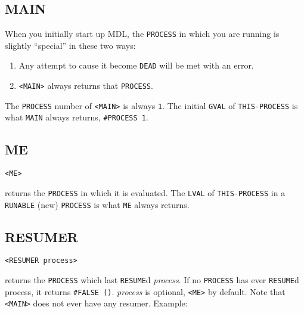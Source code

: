 \documentclass[a4paper]{scrbook}
\providecommand{\tightlist}{%
  \setlength{\itemsep}{0pt}\setlength{\parskip}{0pt}}
\begin{document}
\subsection{MAIN}\label{main}

When you initially start up MDL, the \texttt{PROCESS} in which you are running is slightly ``special'' in these two ways:

\begin{enumerate}
\def\labelenumi{\arabic{enumi}.}
\tightlist
\item
  Any attempt to cause it become \texttt{DEAD} will be met with an error.
\item
  \texttt{\textless{}MAIN\textgreater{}} always returns that \texttt{PROCESS}.
\end{enumerate}

The \texttt{PROCESS} number of \texttt{\textless{}MAIN\textgreater{}} is always \texttt{1}. The initial \texttt{GVAL} of
\texttt{THIS-PROCESS} is what \texttt{MAIN} always returns, \texttt{\#PROCESS\ 1}.

\subsection{ME}\label{me}

\begin{verbatim}
<ME>
\end{verbatim}

 returns the \texttt{PROCESS} in which it is evaluated. The \texttt{LVAL} of
\texttt{THIS-PROCESS} in a \texttt{RUNABLE} (new) \texttt{PROCESS} is what \texttt{ME}
always returns.

\subsection{RESUMER}\label{resumer}

\begin{verbatim}
<RESUMER process>
\end{verbatim}

 returns the \texttt{PROCESS} which last \texttt{RESUME}d \emph{process}. If no
\texttt{PROCESS} has ever \texttt{RESUME}d process, it returns \texttt{\#FALSE\ ()}. \emph{process} is optional,
\texttt{\textless{}ME\textgreater{}} by default. Note that \texttt{\textless{}MAIN\textgreater{}} does
not ever have any resumer. Example:
\end{document}
